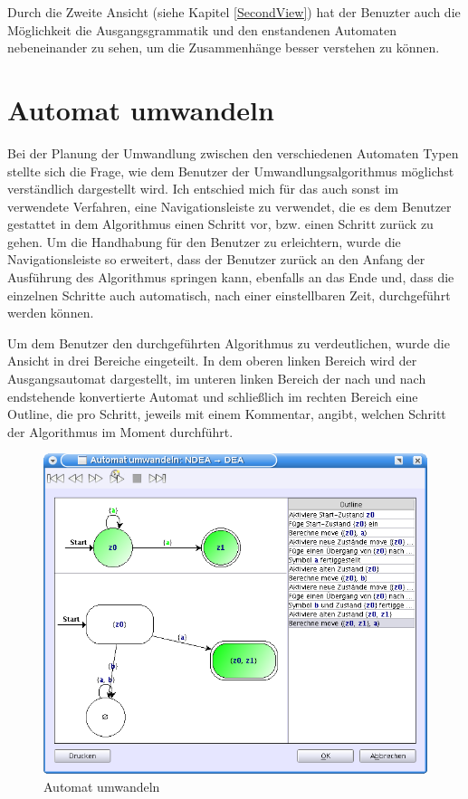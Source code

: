 Durch die Zweite Ansicht (siehe Kapitel \ref{SecondView}) hat der Benuzter auch
die Möglichkeit die Ausgangsgrammatik und den enstandenen Automaten nebeneinander
zu sehen, um die Zusammenhänge besser verstehen zu können.


\section{Automat umwandeln}\label{ConverToMachine}

Bei der Planung der Umwandlung zwischen den verschiedenen Automaten Typen
stellte sich die Frage, wie dem Benutzer der Umwandlungsalgorithmus möglichst
verständlich dargestellt wird. Ich entschied mich für das auch sonst im
\gtitool verwendete Verfahren, eine Navigationsleiste zu verwendet, die es dem
Benutzer gestattet in dem Algorithmus einen Schritt vor, bzw. einen Schritt
zurück zu gehen. Um die Handhabung für den Benutzer zu erleichtern, wurde die
Navigationsleiste so erweitert, dass der Benutzer zurück an den Anfang der
Ausführung des Algorithmus springen kann, ebenfalls an das Ende und, dass die
einzelnen Schritte auch automatisch, nach einer einstellbaren Zeit, durchgeführt
werden können.\vspace{10pt}

Um dem Benutzer den durchgeführten Algorithmus zu verdeutlichen, wurde die
Ansicht in drei Bereiche eingeteilt. In dem oberen linken Bereich wird der
Ausgangsautomat dargestellt, im unteren linken Bereich der nach und nach
endstehende konvertierte Automat und schließlich im rechten Bereich eine
Outline, die pro Schritt, jeweils mit einem Kommentar, angibt, welchen Schritt
der Algorithmus im Moment durchführt.\vspace{10pt}

\begin{figure}[h!]
\begin{center}
\includegraphics[width=12cm]{../images/convert_to.png}
\caption{Automat umwandeln}
\end{center}
\end{figure}

